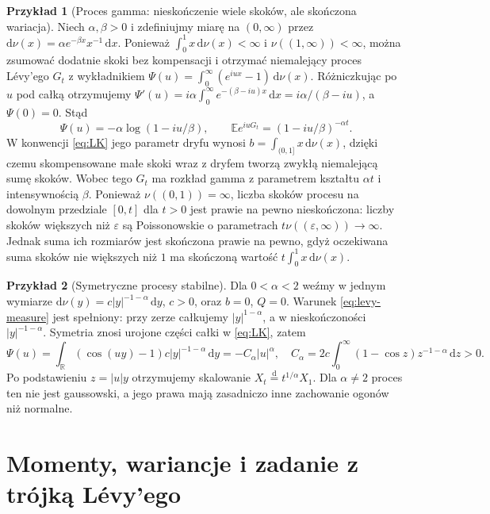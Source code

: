 \documentclass[11pt,a4paper,oneside]{report}
\numberwithin{equation}{chapter}
\theoremstyle{plain}
\theoremstyle{definition}
\newtheorem{przyklad}{Przykład}[chapter]
\theoremstyle{remark}
\newcommand{\R}{\mathbb{R}}
\newcommand{\E}{\mathbb{E}}
\newcommand{\dd}{\mathrm{d}}
\begin{document}
\begin{przyklad}[Proces gamma: nieskończenie wiele skoków, ale skończona wariacja]
Niech $\alpha,\beta>0$ i zdefiniujmy miarę na
$(0,\infty)$ przez
$\dd\nu(x)=\alpha e^{-\beta x}x^{-1}\,\dd x$.
Ponieważ $\int_0^1x\,\dd\nu(x)<\infty$ i
$\nu((1,\infty))<\infty$, można zsumować dodatnie
skoki bez kompensacji i otrzymać niemalejący proces Lévy'ego
$G_t$ z wykładnikiem
$\Psi(u)=\int_0^\infty(e^{iux}-1)\,\dd\nu(x)$.
Różniczkując po $u$ pod całką otrzymujemy
$\Psi'(u)=i\alpha\int_0^\infty e^{-(\beta-iu)x}\,\dd x
=i\alpha/(\beta-iu)$, a $\Psi(0)=0$. Stąd
\[
\Psi(u)=-\alpha\log(1-iu/\beta),\qquad
\E e^{iuG_t}=(1-iu/\beta)^{-\alpha t}.
\]
W konwencji \eqref{eq:LK} jego parametr dryfu wynosi
$b=\int_{(0,1]}x\,\dd\nu(x)$, dzięki czemu
skompensowane małe skoki wraz z dryfem tworzą zwykłą
niemalejącą sumę skoków. Wobec tego $G_t$ ma rozkład gamma z parametrem kształtu
$\alpha t$ i intensywnością $\beta$.
Ponieważ $\nu((0,1))=\infty$, liczba skoków procesu
na dowolnym przedziale $[0,t]$ dla $t>0$ jest prawie
na pewno nieskończona: liczby skoków większych niż
$\varepsilon$ są Poissonowskie o parametrach
$t\nu((\varepsilon,\infty))\to\infty$.
Jednak suma ich rozmiarów jest skończona prawie na pewno,
gdyż oczekiwana suma skoków nie większych niż $1$
ma skończoną wartość $t\int_0^1x\,\dd\nu(x)$.
\end{przyklad}

\begin{przyklad}[Symetryczne procesy stabilne]
Dla $0<\alpha<2$ weźmy w jednym wymiarze
$\dd\nu(y)=c|y|^{-1-\alpha}\,\dd y$, $c>0$,
oraz $b=0$, $Q=0$. Warunek \eqref{eq:levy-measure}
jest spełniony: przy zerze całkujemy $|y|^{1-\alpha}$,
a w nieskończoności $|y|^{-1-\alpha}$.
Symetria znosi urojone części całki w \eqref{eq:LK}, zatem
\[
\Psi(u)=\int_\R(\cos(uy)-1)c|y|^{-1-\alpha}\,\dd y
=-C_\alpha |u|^\alpha,
\quad
C_\alpha=2c\int_0^\infty(1-\cos z)z^{-1-\alpha}\,\dd z>0.
\]
Po podstawieniu $z=|u|y$ otrzymujemy skalowanie
$X_t\overset{\mathrm d}=t^{1/\alpha}X_1$.
Dla $\alpha\ne2$ proces ten nie jest gaussowski, a jego
prawa mają zasadniczo inne zachowanie ogonów niż normalne.
\end{przyklad}

\section{Momenty, wariancje i zadanie z trójką Lévy'ego}
\end{document}
